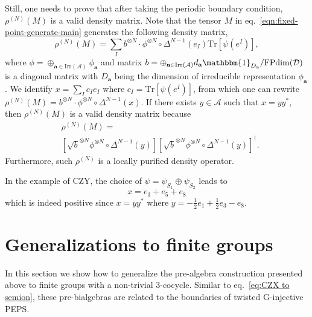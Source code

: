 \documentclass[prx, twocolumn, superscriptaddress, dvipsnames]{revtex4-2}
\theoremstyle{definition}
\newcommand{\tr}{\mathrm{Tr}}
\newcommand{\bo}{\mathbbm{1}}
\newcommand{\mA}{\mathcal{A}}
\newcommand{\dg}{\dagger}
\newcommand{\vbnt}{\mathbf{a}}
\begin{document}
Still, one needs to prove that after taking the periodic boundary condition, $\rho^{(N)}(M)$ is a valid density matrix. Note that the tensor $M$ in eq.~\eqref{eqn:fixed-point-generate-main} generates the following density matrix,
\begin{equation}
    \rho^{(N)}(M)=\sum_I b^{\otimes N}\cdot\phi^{\otimes N}\circ \Delta^{N-1}(e_I) \tr[\psi(e^I)],
\end{equation}
where $\phi=\oplus_{\vbnt\in\mathrm{Irr}(\mA)}\phi_\vbnt$ and matrix $b=\oplus_{\vbnt\in\mathrm{Irr}(\mA)}d_\vbnt \bo_{D_\vbnt}/\mathrm{FPdim}(\mathcal D)$ is a diagonal matrix with $D_\vbnt$ being the dimension of irreducible representation $\phi_\vbnt$. 
We identify $x=\sum_I c_I e_I$ where $c_I=\tr[\psi(e^I)]$, from which one can rewrite $\rho^{(N)}(M)= b^{\otimes N} \cdot\phi^{\otimes N}\circ \Delta^{N-1}(x)$. If there exists $y\in\mA$ such that $x=y y^*$, then $\rho^{(N)}(M)$ is a valid density matrix because
\begin{equation}
\begin{aligned}
    &\rho^{(N)}(M)= \\
    &\left[\sqrt{b}^{\otimes N}\phi^{\otimes N}\circ \Delta^{N-1}(y)\right]\left[\sqrt{b}^{\otimes N}\phi^{\otimes N}\circ \Delta^{N-1}(y)\right]^\dg.
\end{aligned}
\end{equation}
Furthermore, such $\rho^{(N)}$ is a locally purified density operator. 

In the example of CZY, the choice of $\psi=\psi_{S_1}\oplus \psi_{S_2}$ leads to
\[x=e_3+e_5+e_8\]
which is indeed positive since $x=yy^*$ where $y=-\frac{1}{2}e_1+\frac{1}{2}e_3 - e_8$. 



\section{Generalizations to finite groups}
\label{sec:finite group generalization}

In this section we show how to generalize the pre-algebra construction presented above to finite groups with a non-trivial 3-cocycle. Similar to eq.~\eqref{eq:CZX to semion}, these pre-bialgebras are related to the boundaries of twisted G-injective PEPS.
\end{document}
